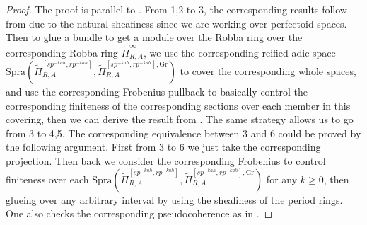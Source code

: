 \documentclass[12pt]{amsart}
\theoremstyle{definition}
\numberwithin{equation}{section}
\begin{document}
\begin{proof}
The proof is parallel to \cite[Theorem 4.6.1]{KL2}. From 1,2 to 3, the corresponding results follow from \cite[Theorem 4.4.3]{KL2} due to the natural sheafiness since we are working over perfectoid spaces. Then to glue a bundle to get a module over the Robba ring over the corresponding Robba ring $\widetilde{\Pi}_{R,A}^\infty$, we use the corresponding reified adic space $\mathrm{Spra}(\widetilde{\Pi}_{R,A}^{[sp^{-kah},rp^{-kah}]},\widetilde{\Pi}_{R,A}^{[sp^{-kah},rp^{-kah}],\mathrm{Gr}})$ to cover the corresponding whole spaces, and use the corresponding Frobenius pullback to basically control the corresponding finiteness of the corresponding sections over each member in this covering, then we can derive the result from \cite[Proposition 2.6.17]{KL2}. The same strategy allows us to go from 3 to 4,5. The corresponding equivalence between 3 and 6 could be proved by the following argument. First from 3 to 6 we just take the corresponding projection. Then back we consider the corresponding Frobenius to control finiteness over each $\mathrm{Spra}(\widetilde{\Pi}_{R,A}^{[sp^{-kah},rp^{-kah}]},\widetilde{\Pi}_{R,A}^{[sp^{-kah},rp^{-kah}],\mathrm{Gr}})$ for any $k\geq 0$, then glueing over any arbitrary interval by using the sheafiness of the period rings. One also checks the corresponding pseudocoherence as in \cite[Theorem 4.6.1]{KL2}.
\end{proof}
\end{document}
